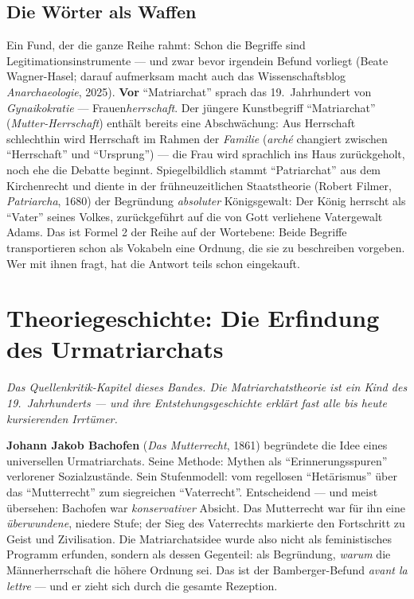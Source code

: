 \documentclass[11pt,a4paper,ngerman]{scrartcl}
\newcommand{\chipbase}[2]{\hspace{0pt}{\footnotesize\textcolor{#1}{[\textsc{#2}]}}}
\newcommand{\chipbelegt}[1]{\chipbase{chipgreen}{#1}}
\begin{document}
\subsection*{Die Wörter als Waffen}
Ein Fund, der die ganze Reihe rahmt: Schon die Begriffe sind Legitimationsinstrumente --- und zwar bevor irgendein Befund vorliegt (Beate Wagner-Hasel; darauf aufmerksam macht auch das Wissenschaftsblog \emph{Anarchaeologie}, 2025). \textbf{Vor} \enquote{Matriarchat} sprach das 19.~Jahrhundert von \emph{Gynaikokratie} --- Frauen\emph{herrschaft}. Der jüngere Kunstbegriff \enquote{Matriarchat} (\emph{Mutter-Herrschaft}) enthält bereits eine Abschwächung: Aus Herrschaft schlechthin wird Herrschaft im Rahmen der \emph{Familie} (\emph{arché} changiert zwischen \enquote{Herrschaft} und \enquote{Ursprung}) --- die Frau wird sprachlich ins Haus zurückgeholt, noch ehe die Debatte beginnt. Spiegelbildlich stammt \enquote{Patriarchat} aus dem Kirchenrecht und diente in der frühneuzeitlichen Staatstheorie (Robert Filmer, \emph{Patriarcha}, 1680) der Begründung \emph{absoluter} Königsgewalt: Der König herrscht als \enquote{Vater} seines Volkes, zurückgeführt auf die von Gott verliehene Vatergewalt Adams. \chipbelegt{belegt} Das ist Formel 2 der Reihe auf der Wortebene: Beide Begriffe transportieren schon als Vokabeln eine Ordnung, die sie zu beschreiben vorgeben. Wer mit ihnen fragt, hat die Antwort teils schon eingekauft.

\section{Theoriegeschichte: Die Erfindung des Urmatriarchats}
\noindent\textit{Das Quellenkritik-Kapitel dieses Bandes. Die Matriarchatstheorie ist ein Kind des 19.~Jahrhunderts --- und ihre Entstehungsgeschichte erklärt fast alle bis heute kursierenden Irrtümer.}
\medskip

\textbf{Johann Jakob Bachofen} (\emph{Das Mutterrecht}, 1861) begründete die Idee eines universellen Urmatriarchats. Seine Methode: Mythen als \enquote{Erinnerungsspuren} verlorener Sozialzustände. Sein Stufenmodell: vom regellosen \enquote{Hetärismus} über das \enquote{Mutterrecht} zum siegreichen \enquote{Vaterrecht}. Entscheidend --- und meist übersehen: Bachofen war \emph{konservativer} Absicht. Das Mutterrecht war für ihn eine \emph{überwundene}, niedere Stufe; der Sieg des Vaterrechts markierte den Fortschritt zu Geist und Zivilisation. Die Matriarchatsidee wurde also nicht als feministisches Programm erfunden, sondern als dessen Gegenteil: als Begründung, \emph{warum} die Männerherrschaft die höhere Ordnung sei. \chipbelegt{belegt} Das ist der Bamberger-Befund \emph{avant la lettre} --- und er zieht sich durch die gesamte Rezeption.
\end{document}
